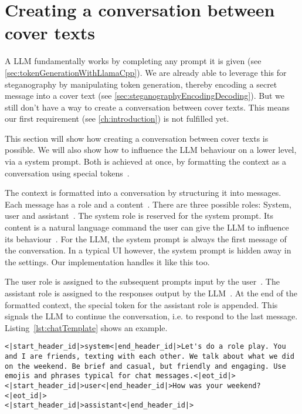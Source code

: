 \section{Creating a conversation between cover texts}
\label{sec:creatingAConversationBetweenCoverTexts}
A \gls{LLM} fundamentally works by completing any prompt it is given (see \cref{sec:tokenGenerationWithLlamaCpp}). We are already able to leverage this for steganography by manipulating token generation, thereby encoding a secret message into a cover text (see \cref{sec:steganographyEncodingDecoding}). But we still don't have a way to create a conversation between cover texts. This means our first requirement (see \cref{ch:introduction}) is not fulfilled yet.

This section will show how creating a conversation between cover texts is possible. We will also show how to influence the \gls{LLM} behaviour on a lower level, via a system prompt. Both is achieved at once, by formatting the context as a conversation using special tokens~\cite{jiangChatBugCommonVulnerability2025}.

The context is formatted into a conversation by structuring it into messages. Each message has a role and a content~\cite{jiangChatBugCommonVulnerability2025}. There are three possible roles: System, user and assistant~\cite{jiangChatBugCommonVulnerability2025}. The system role is reserved for the system prompt. Its content is a natural language command the user can give the \gls{LLM} to influence its behaviour~\cite{jiangChatBugCommonVulnerability2025}. For the \gls{LLM}, the system prompt is always the first message of the conversation. In a typical \gls{UI} however, the system prompt is hidden away in the settings. Our implementation handles it like this too.

The user role is assigned to the subsequent prompts input by the user~\cite{jiangChatBugCommonVulnerability2025}. The assistant role is assigned to the responses output by the \gls{LLM}~\cite{jiangChatBugCommonVulnerability2025}. At the end of the formatted context, the special token for the assistant role is appended. This signals the \gls{LLM} to continue the conversation, i.e. to respond to the last message. Listing~\ref{lst:chatTemplate} shows an example.

\vspace{0.25cm}

\begin{lstlisting}[caption={[llama.cpp: Chat templates]{Example for a context formatted with the chat template of Llama 3.2 1B. Some line breaks have been added for readability.}}, label={lst:chatTemplate}]
<|start_header_id|>system<|end_header_id|>Let's do a role play. You and I are friends, texting with each other. We talk about what we did on the weekend. Be brief and casual, but friendly and engaging. Use emojis and phrases typical for chat messages.<|eot_id|>
<|start_header_id|>user<|end_header_id|>How was your weekend?<|eot_id|>
<|start_header_id|>assistant<|end_header_id|>
\end{lstlisting}

